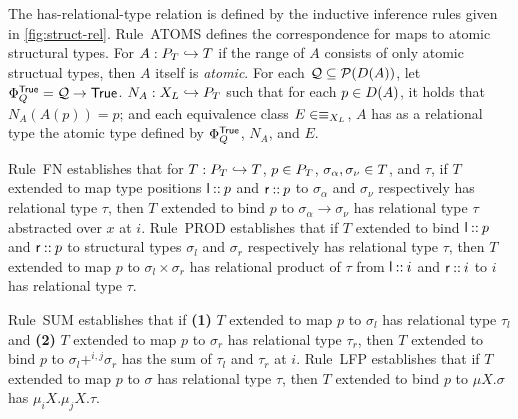 The has-relational-type relation is defined by the inductive inference
rules given in \autoref{fig:struct-rel}.
%
Rule~ATOMS defines the correspondence for maps to atomic structural
types.
For $A : P_T \hookrightarrow T$ if the range of $A$ consists of only
atomic structual types, then $A$ itself is \emph{atomic}.
For each $\mathcal{Q} \subseteq \mathcal{P}(D(A))$, let
$\Phi_Q^{\mathsf{True}} = \mathcal{Q} \to \mathsf{True}$.
$N_A : X_L \hookrightarrow P_T$ such that for each $p \in D(A)$,
it holds that $N_A(A(p)) = p$; %
% 
and each equivalence class $E \in \equiv_{X_L}$, $A$ has as a
relational type the atomic type defined by $\Phi_Q^{\mathsf{True}}$, $N_A$,
and $E$.

Rule~FN establishes that for $T : P_T \hookrightarrow T$,
$p \in P_T$, $\sigma_{\alpha}, \sigma_{\nu} \in T$, and
$\tau$, if $T$ extended to map type positions $\mathsf{l} \mathbin{::} p$ and
$\mathsf{r} \mathbin{::} p$ to $\sigma_{\alpha}$ and $\sigma_{\nu}$
respectively has relational type $\tau$, then $T$ extended to bind $p$
to $\sigma_{\alpha} \to \sigma_{\nu}$ has relational type $\tau$
abstracted over $x$ at $i$.
Rule~PROD establishes that if $T$ extended to bind
$\mathsf{l} \mathbin{::} p$ and $\mathsf{r} \mathbin{::} p$ to structural types
$\sigma_l$ and $\sigma_r$ respectively has relational type $\tau$,
then $T$ extended to map $p$ to $\sigma_l \times \sigma_r$ has
relational product of $\tau$ from $\mathsf{l} \mathbin{::} i$ and
$\mathsf{r} \mathbin{::} i$ to $i$ has relational type $\tau$.

Rule~SUM establishes that if %
\textbf{(1)} $T$ extended to map $p$ to $\sigma_l$ has relational type
$\tau_l$ and %
\textbf{(2)} $T$ extended to map $p$ to $\sigma_r$ has relational type
$\tau_r$, then %
$T$ extended to bind $p$ to $\sigma_l +^{i, j} \sigma_r$ has the sum
of $\tau_l$ and $\tau_r$ at $i$.
%
Rule~LFP establishes that if %
$T$ extended to map $p$ to $\sigma$ has relational type $\tau$, then
$T$ extended to bind $p$ to $\mu X. \sigma$ has
$\mu_i X. \mu_j X. \tau$.

